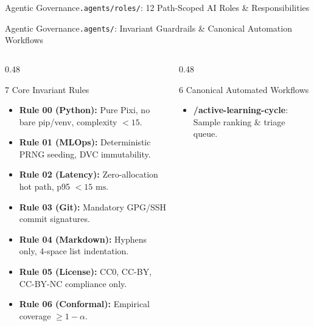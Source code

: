 \begin{frame}{Agentic Governance}{\texttt{.agents/roles/}: 12 Path-Scoped AI Roles \& Responsibilities}
\end{frame}

\begin{frame}{Agentic Governance}{\texttt{.agents/}: Invariant Guardrails \& Canonical Automation Workflows}
    \begin{columns}[T]
        \begin{column}{0.48\textwidth}
            \begin{block}{7 Core Invariant Rules}
                \begin{itemize}\scriptsize
                    \item \textbf{Rule 00 (Python):} Pure Pixi, no bare pip/venv, complexity $< 15$.
                    \item \textbf{Rule 01 (MLOps):} Deterministic PRNG seeding, DVC immutability.
                    \item \textbf{Rule 02 (Latency):} Zero-allocation hot path, p95 $< 15\text{ ms}$.
                    \item \textbf{Rule 03 (Git):} Mandatory GPG/SSH commit signatures.
                    \item \textbf{Rule 04 (Markdown):} Hyphens only, 4-space list indentation.
                    \item \textbf{Rule 05 (License):} CC0, CC-BY, CC-BY-NC compliance only.
                    \item \textbf{Rule 06 (Conformal):} Empirical coverage $\ge 1 - \alpha$.
                \end{itemize}
            \end{block}
        \end{column}
        \begin{column}{0.48\textwidth}
            \begin{block}{6 Canonical Automated Workflows}
                \begin{itemize}\scriptsize
                    \item \textbf{/active-learning-cycle}: Sample ranking \& triage queue.

\end{itemize}
\end{block}
\end{column}
\end{columns}
\end{frame}
